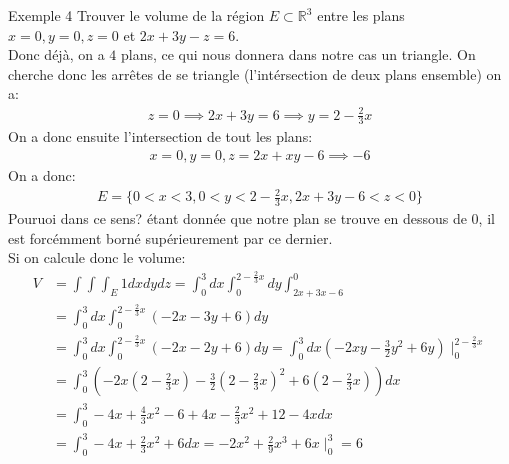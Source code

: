 \begin{parag}{Exemple 4}
	Trouver le volume de la région $E \subset \mathbb{R}^{3}$ entre les plans $x =  0,  y = 0, z= 0$ et $2x + 3y - z =  6$.\\
	Donc déjà, on a $4$ plans, ce qui nous donnera dans notre cas un triangle. On cherche donc les arrêtes de se triangle (l'intérsection de deux plans ensemble) on a:
	\begin{align*} z =  0 \implies 2x + 3y = 6 \implies y =  2 -\frac{2}{3}x \end{align*}
	On a donc ensuite l'intersection de tout les plans:
	\begin{align*} x = 0, y = 0, z = 2x + xy - 6 \implies -6 \end{align*}
	On a donc:
	\begin{align*} E = \{0 < x < 3, 0 < y < 2- \frac{2}{3}x, 2x + 3y - 6 < z < 0\} \end{align*}
	Pouruoi dans ce sens? étant donnée que notre plan se trouve en dessous de 0, il est forcémment borné supérieurement par ce dernier.\\
	Si on calcule donc le volume:
	\begin{align*} 
		V &= \int\int\int_E 1 dxdydz = \int_0^3dx \int_0^{2 - \frac{2}{3}x}dy \int_{2x + 3x - 6}^0\\
		  &= \int_0^3dx \int_0^{2 - \frac{2}{3}x}(-2x - 3y + 6)dy\\
		  &= \int_0^3dx \int_0^{2 - \frac{2}{3}x}(-2x - 2y + 6)dy =  \int_0^3dx (-2xy - \frac{3}{2}y^2 + 6y) \mid_0^{2 - \frac{2}{3}x}\\
		  &= \int_0^3 (-2x(2 - \frac{2}{3}x)- \frac{3}{2}(2- \frac{2}{3}x)^2 + 6(2 - \frac{2}{3}x))dx \\
		  &= \int_0^3 -4x + \frac{4}{3}x^2 - 6 + 4x - \frac{2}{3}x^2 + 12 - 4x dx\\
		  &= \int_0^3 - 4x + \frac{2}{3}x^2 + 6 dx = -2x^2 + \frac{2}{9}x^3 + 6x \mid_0^3 =  6
	\end{align*}
\end{parag}



